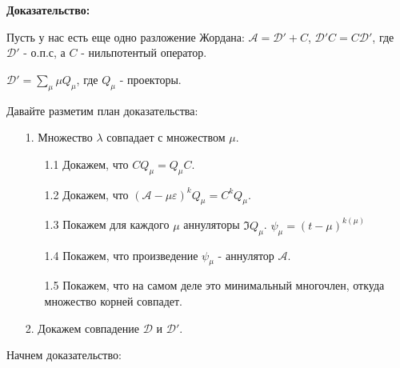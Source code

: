 \textbf{Доказательство:}

Пусть у нас есть еще одно разложение Жордана: $\mathcal{A} = \mathcal{D}'  + C$, $\mathcal{D}'C=C\mathcal{D}'$, где $\mathcal{D}'$ - о.п.с, а $C$ - нильпотентый оператор.

$\mathcal{D'} = \sum\limits_{\mu}\mu Q_\mu$, где $Q_{\mu}$ - проекторы.

Давайте разметим план доказательства:
\begin{enumerate}
    \item[1.] Множество $\lambda$ совпадает с множеством $\mu$.
    \begin{enumerate}
        \item[1.1] Докажем, что $CQ_{\mu}=Q_{\mu}C$.
        \item[1.2] Докажем, что $(\mathcal{A-\mu\varepsilon})^kQ_{\mu} = C^kQ_{\mu}$.
        \item[1.3] Покажем для каждого $\mu$ аннуляторы $\Im Q_{\mu}$. $\psi_{\mu} = (t-\mu)^{k(\mu)}$ 
        \item[1.4] Покажем, что произведение $\psi_{\mu}$ - аннулятор $\mathcal{A}$.
        \item[1.5] Покажем, что на самом деле это минимальный многочлен, откуда множество корней совпадет.
    \end{enumerate}
    \item [2.] Докажем совпадение $\mathcal{D}$ и $\mathcal{D}'$.
\end{enumerate}
Начнем доказательство:
